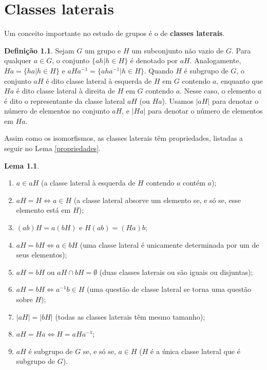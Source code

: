 \documentclass[a4paper,portuguese,11pt,twoside, leqno]{book}
\theoremstyle{definition}
\newtheorem{lemma}[theorem]{Lema}
\newtheorem{deff}{Definição}[section]
\begin{document}
	\chapter{Classes laterais} \label{capitulo classes laterais}
	\hspace{12pt} Um conceito importante no estudo de grupos é o de \textbf{classes laterais}.
	\begin{deff}
		\label{def classes laterais}
		Sejam $G$ um grupo e $H$ um subconjunto não vazio de $G$. Para qualquer $a\in G$,	o conjunto $\{ah | h \in H \}$ é denotado por $aH$. Analogamente, $Ha = \{ha | h \in H\}$
		e $aHa^{-1} = \{aha^{-1} | h \in H\}$. Quando $H$ é subgrupo de $G$, o conjunto $aH$ é dito classe lateral à esquerda de $H$ em $G$ contendo $a$, enquanto que $Ha$ é dito classe lateral à direita de $H$ em $G$ contendo $a$. Nesse caso, o elemento $a$ é dito o representante da classe lateral $aH$ (ou $Ha$). Usamos $|aH|$ para denotar o número de elementos no conjunto $aH$, e $|Ha|$ para denotar o número de elementos em $Ha$.
	\end{deff}
	\par\vspace{0.3cm} Assim como os isomorfismos, as classes laterais têm propriedades, listadas a seguir no Lema \eqref{propriedades}.
	\begin{lemma}
		\label{propriedades}
		\begin{enumerate}
			\item $a\in aH$ (a classe lateral à esquerda de $H$ contendo $a$ contém $a$); 
			\item $aH = H \Leftrightarrow a\in H$ (a classe lateral absorve um elemento se, e só se, esse elemento está em $H$);
			\item $(ab)H = a(bH)$ e $H(ab) = (Ha)b$;
			\item $aH = bH \Leftrightarrow a\in bH$ (uma classe lateral é unicamente determinada por um de seus elementos);
			\item $aH = bH$ ou $aH \cap bH = \emptyset$ (duas classes laterais ou são iguais ou disjuntas);
			\item $aH = bH \Leftrightarrow a^{-1}b\in H$ (uma questão de classe lateral se torna uma questão sobre $H$);
			\item $|aH| = |bH|$ (todas as classes laterais têm mesmo tamanho);
			\item $aH = Ha \Leftrightarrow H = aHa^{-1}$;
			\item $aH$ é subgrupo de $G$ se, e só se, $a\in H$ ($H$ é a única classe lateral que é subgrupo de $G$).
		\end{enumerate}	
	\end{lemma}
\end{document}
